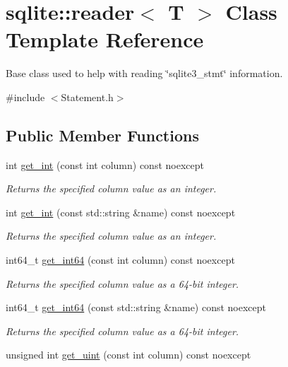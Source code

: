 \hypertarget{a00010}{\section{sqlite\-:\-:reader$<$ T $>$ Class Template Reference}
\label{a00010}
}


Base class used to help with reading \char`\"{}sqlite3\-\_\-stmt\char`\"{} information.  




{\ttfamily \#include $<$Statement.\-h$>$}

\subsection*{Public Member Functions}
\begin{DoxyCompactItemize}
\item 
int \hyperlink{a00010_a1c720c80fd5c1f0f618c24a3d09e2ef5}{get\-\_\-int} (const int column) const noexcept
\begin{DoxyCompactList}\small\item\em Returns the specified column value as an integer. \end{DoxyCompactList}\item 
int \hyperlink{a00010_a7e1f86fdffd271cb92deb0b21d22fd05}{get\-\_\-int} (const std\-::string \&name) const noexcept
\begin{DoxyCompactList}\small\item\em Returns the specified column value as an integer. \end{DoxyCompactList}\item 
int64\-\_\-t \hyperlink{a00010_afaf16f586744a6bc0ecfb74ab791306c}{get\-\_\-int64} (const int column) const noexcept
\begin{DoxyCompactList}\small\item\em Returns the specified column value as a 64-\/bit integer. \end{DoxyCompactList}\item 
int64\-\_\-t \hyperlink{a00010_a87383f607d2ffc2875eac57ecf8e3989}{get\-\_\-int64} (const std\-::string \&name) const noexcept
\begin{DoxyCompactList}\small\item\em Returns the specified column value as a 64-\/bit integer. \end{DoxyCompactList}\item 
unsigned int \hyperlink{a00010_a02e09a2778e2f4d146ef02cd6c9e86df}{get\-\_\-uint} (const int column) const noexcept

\end{DoxyCompactItemize}
